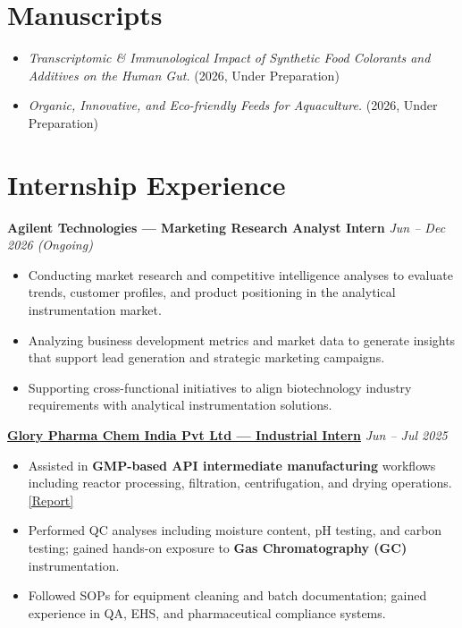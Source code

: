 \documentclass[10pt, a4paper]{article}
\newcommand{\roleentry}[2]{%
  \textbf{#1} \hfill \textit{#2}%
}
\newenvironment{rlist}{%
  \begin{itemize}[
    leftmargin=1.4em,
    itemsep=1.5pt,
    parsep=0pt,
    topsep=2pt,
    label=\textcolor{accentNavy}{\textbullet}
  ]
}{\end{itemize}}
\begin{document}
\section{Manuscripts}

\begin{rlist}
  \item \textit{Transcriptomic \& Immunological Impact of Synthetic Food Colorants and Additives on the Human Gut.} (2026, Under Preparation)
  \item \textit{Organic, Innovative, and Eco-friendly Feeds for Aquaculture.} (2026, Under Preparation)
\end{rlist}

\section{Internship Experience}

\roleentry{Agilent Technologies --- Marketing Research Analyst Intern}{Jun -- Dec 2026 (Ongoing)}
\begin{rlist}
  \item Conducting market research and competitive intelligence analyses to evaluate trends, customer profiles, and product positioning in the analytical instrumentation market.
  \item Analyzing business development metrics and market data to generate insights that support lead generation and strategic marketing campaigns.
  \item Supporting cross-functional initiatives to align biotechnology industry requirements with analytical instrumentation solutions.
\end{rlist}

\vspace{4pt}

\roleentry{\href{https://drive.google.com/file/d/1N4Q_junv58srhy40vKJRibICiJUsM_0E/view?usp=sharing}{Glory Pharma Chem India Pvt Ltd --- Industrial Intern}}{Jun -- Jul 2025}
\begin{rlist}
  \item Assisted in \textbf{GMP-based API intermediate manufacturing} workflows including reactor processing, filtration, centrifugation, and drying operations. \href{https://drive.google.com/file/d/1_mGYxm8XGHMKVEL42TdYm6siZdXtcj2E/view?usp=sharing}{[Report]}
  \item Performed QC analyses including moisture content, pH testing, and carbon testing; gained hands-on exposure to \textbf{Gas Chromatography (GC)} instrumentation.
  \item Followed SOPs for equipment cleaning and batch documentation; gained experience in QA, EHS, and pharmaceutical compliance systems.
\end{rlist}
\end{document}

